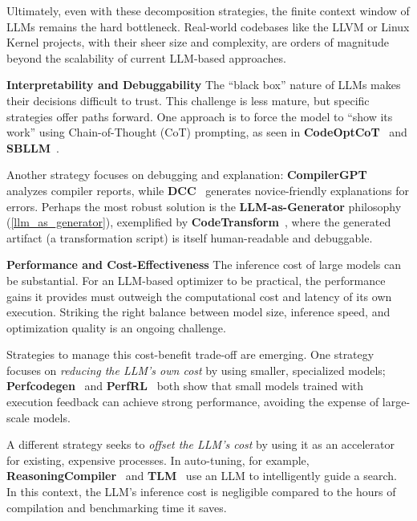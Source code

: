 \documentclass[pdflatex,sn-mathphys-ay,twocolumn, a4paper]{sn-jnl}%
\theoremstyle{thmstyleone}%
\theoremstyle{thmstyletwo}%
\theoremstyle{thmstylethree}%
\begin{document}
Ultimately, even with these decomposition strategies, the finite context window of LLMs remains the hard bottleneck. Real-world codebases like the LLVM or Linux Kernel projects, with their sheer size and complexity, are orders of magnitude beyond the scalability of current LLM-based approaches.

\textbf{Interpretability and Debuggability}
The ``black box'' nature of LLMs makes their decisions difficult to trust. This challenge is less mature, but specific strategies offer paths forward. One approach is to force the model to ``show its work'' using Chain-of-Thought (CoT) prompting, as seen in \textbf{CodeOptCoT}~\citep{116_xu2024code} and \textbf{SBLLM}~\citep{17_gao2025search}.

Another strategy focuses on debugging and explanation: \textbf{CompilerGPT}~\citep{3_compilergpt2025_arxiv} analyzes compiler reports, while \textbf{DCC}~\citep{80_dcc2024} generates novice-friendly explanations for errors. Perhaps the most robust solution is the \textbf{LLM-as-Generator} philosophy (\autoref{llm_as_generator}), exemplified by \textbf{CodeTransform}~\citep{178_cummins2024donttransformcodecode}, where the generated artifact (a transformation script) is itself human-readable and debuggable.

\textbf{Performance and Cost-Effectiveness}
The inference cost of large models can be substantial. For an LLM-based optimizer to be practical, the performance gains it provides must outweigh the computational cost and latency of its own execution. Striking the right balance between model size, inference speed, and optimization quality is an ongoing challenge.

Strategies to manage this cost-benefit trade-off are emerging. One strategy focuses on \textit{reducing the LLM's own cost} by using smaller, specialized models; \textbf{Perfcodegen}~\citep{52_peng2025perfcodegen} and \textbf{PerfRL}~\citep{134_duan2025perfrlsmalllanguagemodel} both show that small models trained with execution feedback can achieve strong performance, avoiding the expense of large-scale models.

A different strategy seeks to \textit{offset the LLM's cost} by using it as an accelerator for existing, expensive processes. In auto-tuning, for example, \textbf{ReasoningCompiler}~\citep{4_tang2025compiler_arxiv} and \textbf{TLM}~\citep{167_zhai2024_osdi} use an LLM to intelligently guide a search. In this context, the LLM's inference cost is negligible compared to the hours of compilation and benchmarking time it saves.
\end{document}
